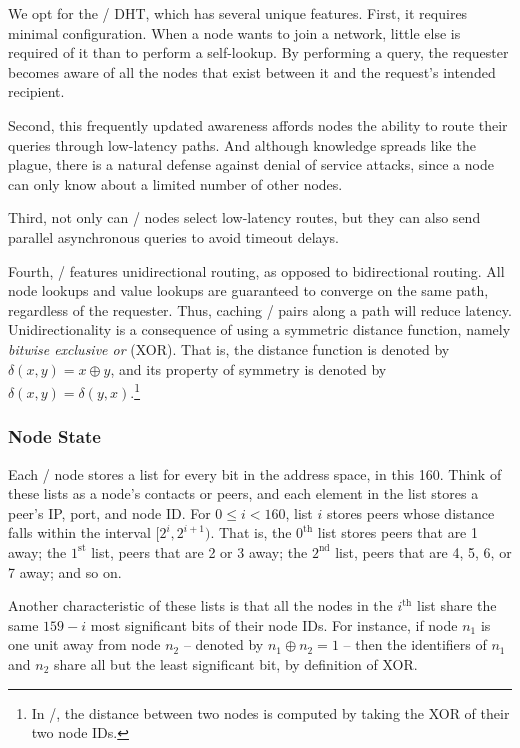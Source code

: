 \documentclass[11pt,twocolumn]{article}
\begin{document}
We opt for the \Kademlia/ DHT, which has several unique features.
First, it requires minimal configuration.
When a node wants to join a network, little else is required of it than to perform a self-lookup.
By performing a query, the requester becomes aware of all the nodes that exist between it and the request's intended recipient.

Second, this frequently updated awareness affords nodes the ability to route their queries through low-latency paths.
And although knowledge spreads like the plague, there is a natural defense against denial of service attacks, since a node can only know about a limited number of other nodes.

Third, not only can \Kademlia/ nodes select low-latency routes, but they can also send parallel asynchronous queries to avoid timeout delays.

Fourth, \Kademlia/ features unidirectional routing, as opposed to bidirectional routing.
All node lookups and value lookups are guaranteed to converge on the same path, regardless of the requester.
Thus, caching \kv/ pairs along a path will reduce latency.
Unidirectionality is a consequence of using a symmetric distance function, namely \emph{bitwise exclusive or} (XOR).
That is, the distance function is denoted by $\delta(x,y) = x \oplus y$, and its property of symmetry is denoted by $\delta(x,y) = \delta(y,x)$.\footnote{In \Kademlia/, the distance between two nodes is computed by taking the XOR of their two node IDs.}

\subsubsection{Node State}
Each \Kademlia/ node stores a list for every bit in the address space, in this 160.
Think of these lists as a node's contacts or peers, and each element in the list stores a peer's IP, port, and node ID.
For $0 \leq i < 160$, list $i$ stores peers whose distance falls within the interval $[2^i, 2^{i+1})$.
That is, the $0^{\mathrm{th}}$ list stores peers that are 1 away; the $1^{\mathrm{st}}$ list, peers that are 2 or 3 away; the $2^{\mathrm{nd}}$ list, peers that are 4, 5, 6, or 7 away; and so on.

Another characteristic of these lists is that all the nodes in the $i^{\mathrm{th}}$ list share the same $159 - i$ most significant bits of their node IDs. For instance, if node $n_1$ is one unit away from node $n_2$ -- denoted by $n_1 \oplus n_2 = 1$ -- then the identifiers of $n_1$ and $n_2$ share all but the least significant bit, by definition of XOR.
\end{document}
